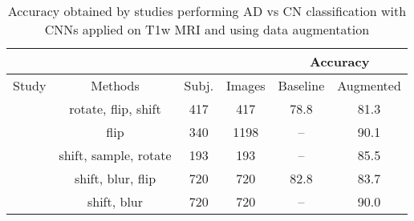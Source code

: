 \documentclass[10pt,journal,compsoc]{IEEEtran}
\begin{document}
\begin{table}[ht]
\caption{Accuracy obtained by studies performing AD vs CN classification with CNNs applied on T1w MRI and using data augmentation}
\label{table:background}
\begin{center}
\setlength{\tabcolsep}{3pt}
\begin{tabular}{c | c | c | c | c | c} 
\cline{5-6}
\multicolumn{4}{c}{} & \multicolumn{2}{|c}{Accuracy} \\
\hline
Study & Methods & Subj. & Images & Baseline & Augmented \\
\hline
\cite{valliani_deep_2017} & rotate, flip, shift & 417 & 417 & 78.8 & 81.3 \\
\cite{backstrom_efficient_2018} & flip & 340 & 1198 & -- & 90.1 \\
\cite{cheng_cnns_2017} & shift, sample, rotate & 193 & 193 &  -- & 85.5 \\
\cite{aderghal_classification_2017} & shift, blur, flip & 720 & 720 & 82.8 & 83.7 \\ 
\cite{aderghal_classification_2018} & shift, blur & 720 & 720 & -- & 90.0 \\
\hline
\end{tabular}
\end{center}
\end{table}


\end{document}
